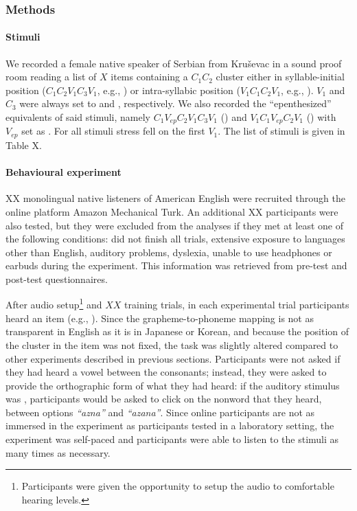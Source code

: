{\subsubsection{Methods}
\paragraph{Stimuli}
We recorded a female native speaker of Serbian from Kruševac in a sound proof room reading a list of {\color{red}$X$} items containing a $C_{1}C_{2}$ cluster either in syllable-initial position ($C_{1}C_{2}V_{1}C_{3}V_{1}$, e.g., ) or intra-syllabic position ($V_{1}C_{1}C_{2}V_{1}$, e.g., ). $V_{1}$ and $C_{3}$ were always set to  and , respectively. 
We also recorded the ``epenthesized'' equivalents of said stimuli, namely $C_{1}V_{ep}C_{2}V_{1}C_{3}V_{1}$ () and $V_{1}C_{1}V_{ep}C_{2}V_{1}$ () with $V_{ep}$ set as {\color{red}\textipa{[@]}}.
For all stimuli stress fell on the first $V_{1}$.
{\color{red}The list of stimuli is given in Table X.}

\paragraph{Behavioural experiment}
{\color{red}XX} monolingual native listeners of American English were recruited through the online platform Amazon Mechanical Turk. An additional {\color{red}XX participants were also tested, but they were excluded from the analyses if they met at least one of the following conditions: did not finish all trials, extensive exposure to languages other than English, auditory problems, dyslexia, unable to use headphones or earbuds during the experiment}. This information was retrieved from pre-test and post-test questionnaires.

After audio setup\footnote{Participants were given the opportunity to setup the audio to comfortable hearing levels.} and {\color{red}$XX$} training trials, in each experimental trial participants heard an item (e.g., ). Since the grapheme-to-phoneme mapping is not as transparent in English as it is in Japanese or Korean, and because the position of the cluster in the item was not fixed, the task was slightly altered compared to other experiments described in previous sections. Participants were not asked if they had heard a vowel between the consonants; instead, they were asked to provide the orthographic form of what they had heard: if the auditory stimulus was , participants would be asked to click on the nonword that they heard, between options \textit{``azna''} and  \textit{``azana''}. Since online participants are not as immersed in the experiment as participants tested in a laboratory setting, the experiment was self-paced and participants were able to listen to the stimuli as many times as necessary.

}

